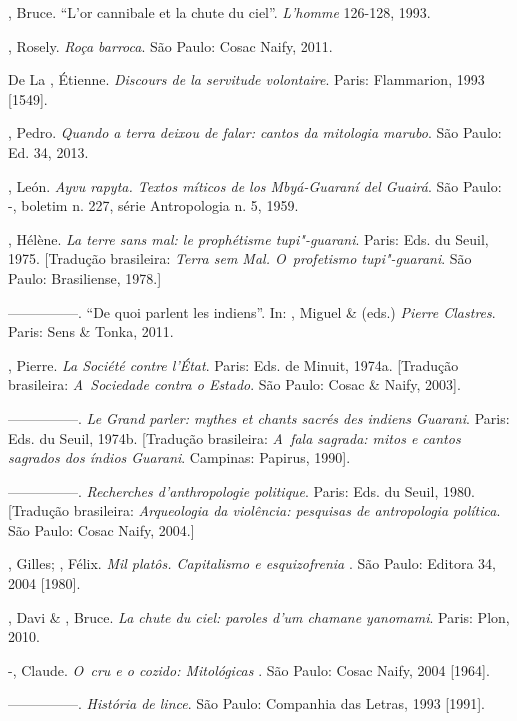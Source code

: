\begin{Parskip}
, Bruce. ``L’or cannibale et la chute du ciel''. \emph{L’homme} 126-128,
1993.

 , Rosely. \emph{Roça barroca}. São Paulo: Cosac Naify, 2011.

De La , Étienne. \emph{Discours de la servitude volontaire}. Paris:
Flammarion, 1993 [1549].

, Pedro. \emph{Quando a terra deixou de falar: cantos da mitologia
marubo}. São Paulo: Ed. 34, 2013.

, León. \emph{Ayvu rapyta. Textos míticos de los Mbyá-Guaraní del
Guairá}. São Paulo: -, boletim n. 227, série Antropologia n. 5,
1959.

, Hélène. \emph{La terre sans mal: le prophétisme tupi"-guarani}. Paris:
Eds. du Seuil, 1975. [Tradução brasileira: \emph{Terra sem Mal. O~profetismo
tupi"-guarani}. São Paulo: Brasiliense, 1978.]

—————. ``De quoi parlent les indiens''. In: , Miguel \& 
(eds.) \emph{Pierre Clastres}. Paris: Sens \& Tonka, 2011.

, Pierre. \emph{La Société contre l’État}. Paris: Eds. de Minuit,
1974a. [Tradução brasileira: \emph{A~Sociedade contra o Estado}. São Paulo:
Cosac \& Naify, 2003].

—————. \emph{Le Grand parler: mythes et chants sacrés des indiens Guarani}.
Paris: Eds. du Seuil, 1974b. [Tradução brasileira: \emph{A~fala sagrada:
mitos e cantos sagrados dos índios Guarani}. Campinas: Papirus, 1990]. 

—————. \emph{Recherches d’anthropologie politique}. Paris: Eds. du Seuil, 1980.
[Tradução brasileira: \emph{Arqueologia da violência: pesquisas de
antropologia política}. São Paulo: Cosac Naify, 2004.] 

, Gilles; , Félix. \emph{Mil platôs. Capitalismo e
esquizofrenia }. São Paulo: Editora 34, 2004 [1980].

, Davi \& , Bruce. \emph{La chute du ciel: paroles d’um chamane
yanomami}. Paris: Plon, 2010.

-, Claude. \emph{O~cru e o cozido: Mitológicas }. São Paulo: Cosac
Naify, 2004 [1964].

—————. \emph{História de lince}. São Paulo: Companhia das Letras, 1993 [1991]. 


\end{Parskip}
